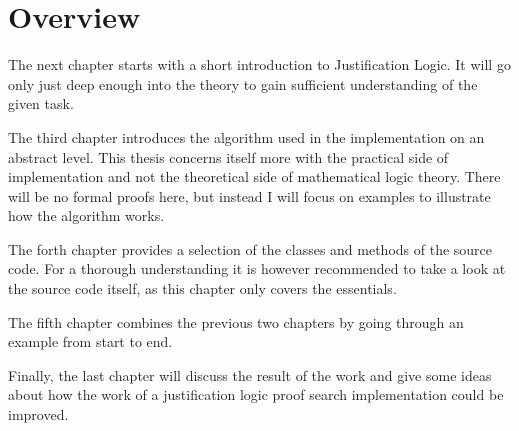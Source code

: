 \section{Overview}
The next chapter starts with a short introduction to Justification Logic. It will go only just deep enough into the theory to gain sufficient understanding of the given task.

The third chapter introduces the algorithm used in the implementation on an abstract level. This thesis concerns itself more with the practical side of implementation and not the theoretical side of mathematical logic theory. There will be no formal proofs here, but instead I will focus on examples to illustrate how the algorithm works.

The forth chapter provides a selection of the classes and methods of the source code. For a thorough understanding it is however recommended to take a look at the source code itself, as this chapter only covers the essentials. 

The fifth chapter combines the previous two chapters by going through an example from start to end.

Finally, the last chapter will discuss the result of the work and give some ideas about how the work of a justification logic proof search implementation could be improved.